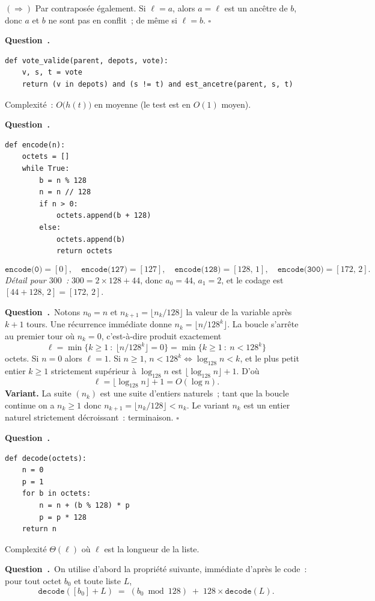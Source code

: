 \documentclass[11pt,a4paper]{article}
\renewcommand{\Q}{\medskip\par\stepcounter{qcnt}\noindent\textbf{\color{cnc}Question~\theqcnt.}~}
\begin{document}
$(\Rightarrow)$ Par contraposée également. Si $\ell=a$, alors $a=\ell$ est un ancêtre de
$b$, donc $a$ et $b$ ne sont pas en conflit~; de même si $\ell=b$. \hfill$\square$

\Q
\begin{lstlisting}
def vote_valide(parent, depots, vote):
    v, s, t = vote
    return (v in depots) and (s != t) and est_ancetre(parent, s, t)
\end{lstlisting}
Complexité~: $O\big(h(t)\big)$ en moyenne (le test  est en $O(1)$ moyen).

\Q
\begin{lstlisting}
def encode(n):
    octets = []
    while True:
        b = n % 128
        n = n // 128
        if n > 0:
            octets.append(b + 128)
        else:
            octets.append(b)
            return octets
\end{lstlisting}
\[
\texttt{encode(0)} = [0],\quad
\texttt{encode(127)} = [127],\quad
\texttt{encode(128)} = [128,\,1],\quad
\texttt{encode(300)} = [172,\,2].
\]
\emph{Détail pour $300$~:} $300 = 2\times 128 + 44$, donc $a_0=44$, $a_1=2$, et le codage est
$[44+128,\,2]=[172,\,2]$.

\Q Notons $n_0=n$ et $n_{k+1}=\lfloor n_k/128\rfloor$ la valeur de la variable 
après $k+1$ tours. Une récurrence immédiate donne $n_k=\lfloor n/128^k\rfloor$. La boucle
s'arrête au premier tour où $n_{k}=0$, c'est-à-dire produit exactement
\[ \ell = \min\{k\ge 1 \ :\ \lfloor n/128^{k}\rfloor = 0\}
     = \min\{k\ge 1 \ :\ n<128^{k}\} \]
octets. Si $n=0$ alors $\ell=1$. Si $n\ge 1$, $n<128^k \iff \log_{128} n < k$, et le plus
petit entier $k\ge1$ strictement supérieur à $\log_{128}n$ est
$\lfloor \log_{128} n\rfloor+1$. D'où
\[ \ell = \lfloor \log_{128} n\rfloor + 1 = O(\log n). \]
\textbf{Variant.} La suite $(n_k)$ est une suite d'entiers naturels~; tant que la boucle
continue on a $n_k\ge 1$ donc $n_{k+1}=\lfloor n_k/128\rfloor < n_k$. Le variant $n_k$ est
un entier naturel strictement décroissant~: terminaison. \hfill$\square$

\Q
\begin{lstlisting}
def decode(octets):
    n = 0
    p = 1
    for b in octets:
        n = n + (b % 128) * p
        p = p * 128
    return n
\end{lstlisting}
Complexité $\Theta(\ell)$ où $\ell$ est la longueur de la liste.

\Q On utilise d'abord la propriété suivante, immédiate d'après le code~: pour tout octet
$b_0$ et toute liste $L$,
\begin{equation}\label{eq:dec}
\texttt{decode}([b_0]+L) \;=\; (b_0 \bmod 128) \;+\; 128\times \texttt{decode}(L).
\end{equation}
\end{document}
